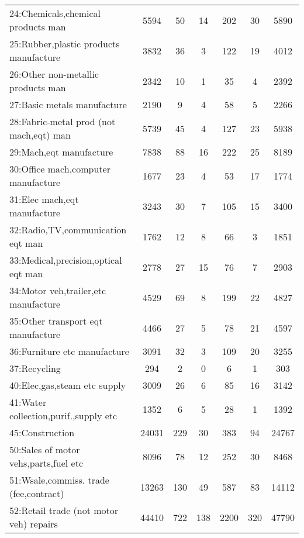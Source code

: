 {\begin{longtable}{l*{6}{c}}
24:Chemicals,chemical products man&     5594&       50&       14&      202&       30&     5890\\
25:Rubber,plastic products manufacture&     3832&       36&        3&      122&       19&     4012\\
26:Other non-metallic products man&     2342&       10&        1&       35&        4&     2392\\
27:Basic metals manufacture&     2190&        9&        4&       58&        5&     2266\\
28:Fabric-metal prod (not mach,eqt) man&     5739&       45&        4&      127&       23&     5938\\
29:Mach,eqt manufacture&     7838&       88&       16&      222&       25&     8189\\
30:Office mach,computer manufacture&     1677&       23&        4&       53&       17&     1774\\
31:Elec mach,eqt manufacture&     3243&       30&        7&      105&       15&     3400\\
32:Radio,TV,communication eqt man&     1762&       12&        8&       66&        3&     1851\\
33:Medical,precision,optical eqt man&     2778&       27&       15&       76&        7&     2903\\
34:Motor veh,trailer,etc manufacture&     4529&       69&        8&      199&       22&     4827\\
35:Other transport eqt manufacture&     4466&       27&        5&       78&       21&     4597\\
36:Furniture etc manufacture&     3091&       32&        3&      109&       20&     3255\\
37:Recycling&      294&        2&        0&        6&        1&      303\\
40:Elec,gas,steam etc supply&     3009&       26&        6&       85&       16&     3142\\
41:Water collection,purif.,supply etc&     1352&        6&        5&       28&        1&     1392\\
45:Construction&    24031&      229&       30&      383&       94&    24767\\
50:Sales of motor vehs,parts,fuel etc&     8096&       78&       12&      252&       30&     8468\\
51:Wsale,commiss. trade (fee,contract)&    13263&      130&       49&      587&       83&    14112\\
52:Retail trade (not motor veh) repairs&    44410&      722&      138&     2200&      320&    47790\\

\end{longtable}}
